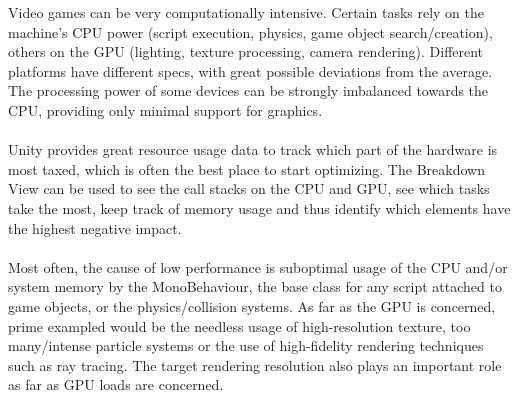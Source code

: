 Video games can be very computationally intensive. Certain tasks rely on the machine's CPU power (script execution, physics, game object search/creation), others on the GPU (lighting, texture processing, camera rendering). Different platforms have different specs, with great possible deviations from the average. The processing power of some devices can be strongly imbalanced towards the CPU, providing only minimal support for graphics. \\ \\
Unity provides great resource usage data to track which part of the hardware is most taxed, which is often the best place to start optimizing. The Breakdown View can be used to see the call stacks on the CPU and GPU, see which tasks take the most, keep track of memory usage and thus identify which elements have the highest negative impact. \\ \\
Most often, the cause of low performance is suboptimal usage of the CPU and/or system memory by the MonoBehaviour, the base class for any script attached to game objects, or the physics/collision systems. As far as the GPU is concerned, prime exampled would be the needless usage of high-resolution texture, too many/intense particle systems or the use of high-fidelity rendering techniques such as ray tracing. The target rendering resolution also plays an important role as far as GPU loads are concerned.